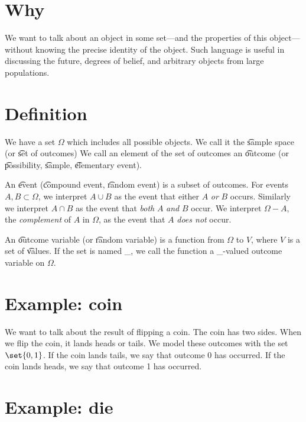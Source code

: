 

\section*{Why}

We want to talk about an object in some set---and the properties of this object---without knowing the precise identity of the object.
Such language is useful in discussing the future, degrees of belief, and arbitrary objects from large populations.

\section*{Definition}

We have a set $\Omega $ which includes all possible objects.
We call it the \t{sample space} (or \t{set of outcomes})
We call an element of the set of outcomes an \t{outcome} (or \t{possibility}, \t{sample}, \t{elementary event}).

An \t{event} (\t{compound event}, \t{random event}) is a subset of outcomes.
For events $A, B \subset \Omega $, we interpret $A \cup B$ as the event that either $A$ \textit{or} $B$ occurs.
Similarly we interpret $A \cap  B$ as the event that \textit{both} $A$ \textit{and} $B$ occur.
We interpret $\Omega  - A$, the \textit{complement} of $A$ in $\Omega $, as the event that $A$ \textit{does not} occur.

An \t{outcome variable} (or \t{random variable}) is a function from $\Omega $ to $V$, where $V$ is a set of \t{values}.
If the set is named \_, we call the function a \_-valued outcome variable on $\Omega $.

\section*{Example: coin}

We want to talk about the result of flipping a coin.
The coin has two sides.
When we flip the coin, it lands heads or tails.
We model these outcomes with the set $\set{0, 1}$.
If the coin lands tails, we say that outcome 0 has occurred.
If the coin lands heads, we say that outcome 1 has occurred.

\section*{Example: die}

